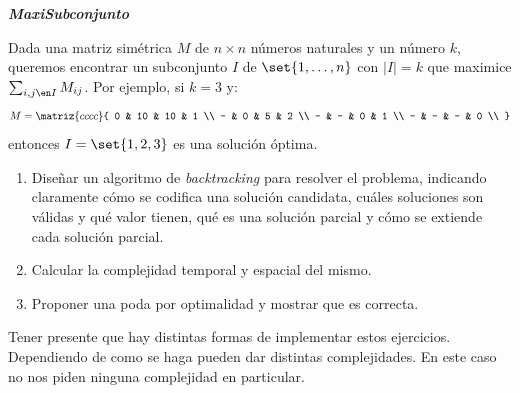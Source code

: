 \begin{enunciado}{\ejercicio[MaxiSubconjunto]}
  \textbf{\textit{MaxiSubconjunto}}

  Dada una matriz simétrica $M$ de $n \times n$ números naturales y un número $k$, queremos encontrar un subconjunto
  $I$ de $\set{1, \ldots, n}$ con $|I| = k$ que maximice $\sum_{i,j\en I} M_{ij}$. Por ejemplo, si $k = 3$ y:
  $$
    M =
    \matriz{cccc}{
      0 & 10 & 10 & 1 \\
      - & 0 & 5 & 2 \\
      - & - & 0 & 1  \\
      - & - & - & 0 \\
    }
  $$
  entonces $I = \set{1,2,3}$ es una solución óptima.
  \begin{enumerate}[label=$\alph*)$]
    \item Diseñar un algoritmo de \textit{backtracking} para resolver el problema, indicando claramente
          cómo se codifica una solución candidata, cuáles soluciones son válidas y qué valor tienen,
          qué es una solución parcial y cómo se extiende cada solución parcial.

    \item Calcular la complejidad temporal y espacial del mismo.

    \item Proponer una poda por optimalidad y mostrar que es correcta.
  \end{enumerate}
\end{enunciado}

Tener presente que hay distintas formas de implementar estos ejercicios.
Dependiendo de como se haga pueden dar distintas complejidades. En este
caso no nos piden ninguna complejidad en particular.

